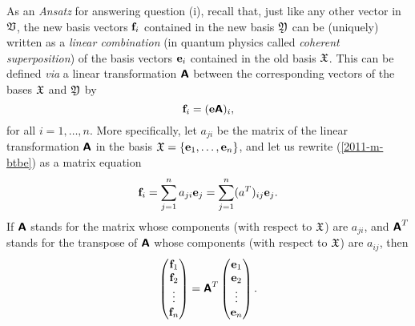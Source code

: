 As an {\it Ansatz} for answering question (i), recall that, just like any other vector in ${\frak V}$,
the new basis vectors ${\bf f}_i$ contained in the new basis ${\frak Y}$
can be (uniquely) written as a {\em linear combination}
(in quantum physics called {\em coherent superposition})
of the basis vectors
${\bf e}_i$ contained in the old  basis ${\frak X}$.
This can be defined {\it via}
a linear transformation $\textsf{\textbf{A}}$ between the corresponding vectors of the bases
 ${\frak X}$ and
${\frak Y}$ by
\begin{equation}
{\bf f}_i= ({\bf e}\textsf{\textbf{A}})_i
,
\label{2011-m-btbe}
\end{equation}
for all $i=1, \ldots , n$.
%
More specifically, let ${a}_{ji}$ be the matrix of the linear transformation $\textsf{\textbf{A}}$
in the basis
${\frak X}
=
\{
{\bf e}_1,
\ldots ,
{\bf e}_n
\}$,
and let us rewrite (\ref{2011-m-btbe}) as a matrix equation
\begin{equation}
{\bf f}_i= \sum_{j=1}^n a_{ji} {\bf e}_j   = \sum_{j=1}^n (a^T)_{ij} {\bf e}_j
.
\label{2011-m-btbe-r}
\end{equation}
If $\textsf{\textbf{A}}$ stands for the matrix whose components (with respect to ${\frak X}$) are  $a_{ji}$,
and $\textsf{\textbf{A}}^T$
stands for the transpose of $\textsf{\textbf{A}}$
whose components (with respect to ${\frak X}$) are  $a_{ij}$,
then
\begin{equation}
\begin{pmatrix}
{\bf f}_1\\
{\bf f}_2\\
\vdots\\
{\bf f}_n
\end{pmatrix}
= \textsf{\textbf{A}}^T
\begin{pmatrix}
{\bf e}_1\\
{\bf e}_2\\
\vdots\\
{\bf e}_n
\end{pmatrix}
.
\label{2011-m-btbe-r1}
\end{equation}

